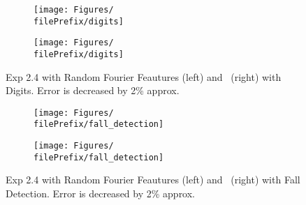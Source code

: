\begin{figure}[H]
  \centering
  \renewcommand{\filePrefix}{\undPrefix/rff}
  \begin{subfigure}[t]{0.5\linewidth}
    \centering\captionsetup{width=.8\linewidth}\texttt{[image: Figures/\\filePrefix/digits]}
    \label{fig:\undPrefix_digits}
  \end{subfigure}%
  \renewcommand{\filePrefix}{\undPrefix/nys}%
  \begin{subfigure}[t]{0.5\linewidth}
    \centering\captionsetup{width=.8\linewidth}\texttt{[image: Figures/\\filePrefix/digits]}
    \label{fig:\undPrefix_digits}
  \end{subfigure}
  \caption*{Exp 2.4 with Random Fourier Feautures (left) and \Nys\ (right) with Digits. Error is decreased by 2\% approx.}
\end{figure}


\begin{figure}[H]
  \centering
  \renewcommand{\filePrefix}{\undPrefix/rff}
  \begin{subfigure}[t]{0.5\linewidth}
    \centering\captionsetup{width=.8\linewidth}\texttt{[image: Figures/\\filePrefix/fall\_detection]}
    \label{fig:\undPrefix_fall_detection}
  \end{subfigure}%
  \renewcommand{\filePrefix}{\undPrefix/nys}%
  \begin{subfigure}[t]{0.5\linewidth}
    \centering\captionsetup{width=.8\linewidth}\texttt{[image: Figures/\\filePrefix/fall\_detection]}
    \label{fig:\undPrefix_fall_detection}
  \end{subfigure}%
  \caption*{Exp 2.4 with Random Fourier Feautures (left) and \Nys\ (right)
   with Fall Detection. Error is decreased by 2\% approx.}
\end{figure}


